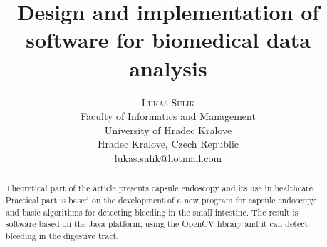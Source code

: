 \documentclass[twoside]{article}
\title{\vspace{-15mm}\fontsize{24pt}{10pt}\selectfont\textbf{Design and implementation of software for biomedical data analysis}} %
\author{
\large
\textsc{Lukas Sulik}\\
\normalsize Faculty of Informatics and Management \\
\normalsize University of Hradec Kralove \\
\normalsize Hradec Kralove, Czech Republic \\
\normalsize \href{mailto:lukas.sulik@hotmail.com}{lukas.sulik@hotmail.com} %
\vspace{-5mm}
}
\date{}
\begin{document}
\maketitle %




\begin{abstract}

\noindent Theoretical part of the article presents capsule endoscopy and its use in healthcare. Practical part is based on the development of a new program for capsule endoscopy and basic algorithms for detecting bleeding in the small intestine. The result is software based on the Java platform, using the OpenCV library and it can detect bleeding in the digestive tract.

\end{abstract}

\end{document}
